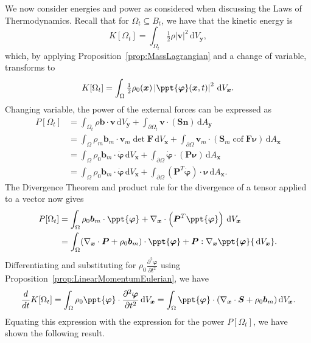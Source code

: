 \documentclass[
  letterpaper,
  DIV=11,
  numbers=noendperiod]{scrreprt}
\theoremstyle{plain}
\theoremstyle{remark}
\begin{document}
We now consider energies and power as considered when discussing the
Laws of Thermodynamics. Recall that for \(\Omega_t\subseteq B_t\), we
have that the kinetic energy is
\[K[\Omega_t] = \int_{\Omega_t}\tfrac12\rho|{\boldsymbol{v}}|^2{\,{\mathrm{d}}V_{{\boldsymbol{y}}}},\]
which, by applying
Proposition~\hyperref[prop:MassLagrangian]{{[}prop:MassLagrangian{]}}
and a change of variable, transforms to
\[K[\Omega_t] = \int_\Omega \tfrac12\rho_0({\boldsymbol{x}})\left|\ppt{\boldsymbol{\varphi}}({\boldsymbol{x}},t)\right|^2{\,{\mathrm{d}}V_{{\boldsymbol{x}}}}.\]
Changing variable, the power of the external forces can be expressed as
\[\begin{aligned}
  P[\Omega_t]
  &= \int_{\Omega_t}\rho{\boldsymbol{b}}\cdot{\boldsymbol{v}}{\,{\mathrm{d}}V_{{\boldsymbol{y}}}}+\int_{\partial\Omega_t}{\boldsymbol{v}}\cdot({\boldsymbol{S}}{\boldsymbol{n}}){\,{\mathrm{d}}A_{{\boldsymbol{y}}}}\\
  &= \int_{\Omega}\rho_m{\boldsymbol{b}}_m\cdot{\boldsymbol{v}}_m\det{\boldsymbol{F}}{\,{\mathrm{d}}V_{{\boldsymbol{x}}}}+\int_{\partial\Omega}{\boldsymbol{v}}_m\cdot({\boldsymbol{S}}_m{\operatorname{cof}}{\boldsymbol{F}}{\boldsymbol{\nu}}){\,{\mathrm{d}}A_{{\boldsymbol{x}}}}\\
  &= \int_{\Omega}\rho_0{\boldsymbol{b}}_m\cdot\dot{\boldsymbol{\varphi}}{\,{\mathrm{d}}V_{{\boldsymbol{x}}}}+\int_{\partial\Omega}\dot{\boldsymbol{\varphi}}\cdot({\boldsymbol{P}}{\boldsymbol{\nu}}){\,{\mathrm{d}}A_{{\boldsymbol{x}}}}\\
  &= \int_{\Omega}\rho_0{\boldsymbol{b}}_m\cdot\dot{\boldsymbol{\varphi}}{\,{\mathrm{d}}V_{{\boldsymbol{x}}}}+\int_{\partial\Omega}({\boldsymbol{P}}^T\dot{\boldsymbol{\varphi}})\cdot{\boldsymbol{\nu}}{\,{\mathrm{d}}A_{{\boldsymbol{x}}}}.
\end{aligned}\] The Divergence Theorem and product rule for the
divergence of a tensor applied to a vector now gives \[\begin{aligned}
  P[\Omega_t]
  &= \int_{\Omega}\rho_0{\boldsymbol{b}}_m\cdot\ppt{\boldsymbol{\varphi}}+\nabla_{\boldsymbol{x}}\cdot\left({\boldsymbol{P}}^T\ppt{\boldsymbol{\varphi}}\right){\,{\mathrm{d}}V_{{\boldsymbol{x}}}}\\
  &=\int_{\Omega}(\nabla_{\boldsymbol{x}}\cdot{\boldsymbol{P}}+\rho_0{\boldsymbol{b}}_m)\cdot\ppt{\boldsymbol{\varphi}}+{\boldsymbol{P}}:\nabla_{\boldsymbol{x}}\ppt{\boldsymbol{\varphi}}{\,{\mathrm{d}}V_{{\boldsymbol{x}}}}.
\end{aligned}\] Differentiating and substituting for
\(\rho_0\frac{\partial^2{\boldsymbol{\varphi}}}{\partial t^2}\) using
Proposition~\hyperref[prop:LinearMomentumEulerian]{{[}prop:LinearMomentumEulerian{]}},
we have
\[\frac{d}{dt}K[\Omega_t] = \int_{\Omega}\rho_0\ppt{\boldsymbol{\varphi}}\cdot\frac{\partial^2{\boldsymbol{\varphi}}}{\partial t^2}{\,{\mathrm{d}}V_{{\boldsymbol{x}}}}=
  \int_{\Omega}\ppt{\boldsymbol{\varphi}}\cdot(\nabla_{\boldsymbol{x}}\cdot{\boldsymbol{S}}+\rho_0{\boldsymbol{b}}_m){\,{\mathrm{d}}V_{{\boldsymbol{x}}}}.\]
Equating this expression with the expression for the power
\(P[\Omega_t]\), we have shown the following result.
\end{document}
